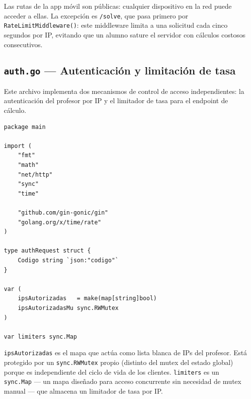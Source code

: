 \documentclass[12pt, a4paper]{article}
\begin{document}
Las rutas de la app móvil son públicas: cualquier dispositivo en la red puede
acceder a ellas. La excepción es \texttt{/solve}, que pasa primero por
\texttt{RateLimitMiddleware()}: este middleware limita a una solicitud cada cinco
segundos por IP, evitando que un alumno sature el servidor con cálculos costosos
consecutivos.

\subsection{\texttt{auth.go} — Autenticación y limitación de tasa}

Este archivo implementa dos mecanismos de control de acceso independientes: la
autenticación del profesor por IP y el limitador de tasa para el endpoint de cálculo.

\begin{lstlisting}[style=golang, caption={\texttt{auth.go} — imports y variables globales}]
package main

import (
    "fmt"
    "math"
    "net/http"
    "sync"
    "time"

    "github.com/gin-gonic/gin"
    "golang.org/x/time/rate"
)

type authRequest struct {
    Codigo string `json:"codigo"`
}

var (
    ipsAutorizadas   = make(map[string]bool)
    ipsAutorizadasMu sync.RWMutex
)

var limiters sync.Map
\end{lstlisting}

\texttt{ipsAutorizadas} es el mapa que actúa como lista blanca de IPs del profesor.
Está protegido por un \texttt{sync.RWMutex} propio (distinto del mutex del estado
global) porque es independiente del ciclo de vida de los clientes.
\texttt{limiters} es un \texttt{sync.Map} — un mapa diseñado para acceso concurrente
sin necesidad de mutex manual — que almacena un limitador de tasa por IP.
\end{document}
